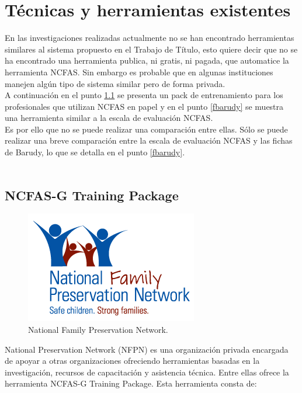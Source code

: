\section{Técnicas y herramientas existentes}
\label{tec}
\vspace{1mm}
\normalsize

En las investigaciones realizadas actualmente no se han encontrado herramientas similares al sistema propuesto en el Trabajo de Título, esto quiere decir que no se ha encontrado una herramienta publica, ni gratis, ni pagada, que automatice la herramienta NCFAS. Sin embargo es probable que en algunas instituciones manejen algún tipo de sistema similar pero de forma privada. \\ 
A continuación en el punto \ref{tpackage} se presenta un pack de entrenamiento para los profesionales que utilizan NCFAS en papel y en el punto \ref{fbarudy} se muestra una herramienta similar a la escala de evaluación NCFAS. \\ 

Es por ello que no se puede realizar una comparación entre ellas. Sólo se puede realizar una breve comparación entre la escala de evaluación NCFAS y las fichas de Barudy, lo que se detalla en el punto \ref{fbarudy}.  \\
\\
\subsection{NCFAS-G Training Package}
\label{tpackage}
\vspace{2mm}
\normalsize

\begin{figure}[htb]
	\label{Figura7}
	\begin{center}
		\includegraphics[scale=0.6]{imagenes/nationalfamily.png}
	\end{center}
	\caption{National Family Preservation Network.}
\end{figure}

National Preservation Network (NFPN) es una organización privada encargada de apoyar a otras organizaciones ofreciendo herramientas basadas en la investigación, recursos de capacitación y asistencia técnica. 
Entre ellas ofrece la herramienta NCFAS-G Training Package. Esta herramienta consta de:

